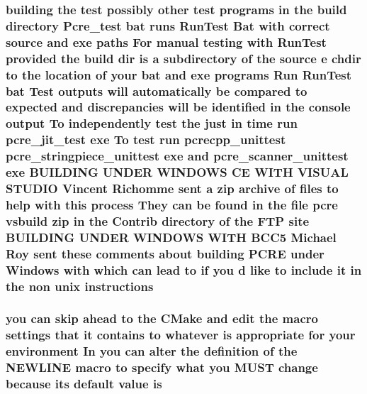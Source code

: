 \subsubsection[{\texorpdfstring{instructions}{instructions}}]{\setlength{\rightskip}{0pt plus 5cm}building the test possibly other test programs {\bf in} the build {\bf directory} Pcre\+\_\+test {\bf bat} runs Run\+Test Bat {\bf with} correct {\bf source} and {\bf exe} paths For manual testing {\bf with} Run\+Test provided the build {\bf dir} {\bf is} {\bf a} subdirectory {\bf of} the {\bf source} {\bf e} chdir {\bf to} the {\bf location} {\bf of} your {\bf bat} and {\bf exe} programs Run Run\+Test {\bf bat} Test outputs will automatically {\bf be} compared {\bf to} {\bf expected} and discrepancies will {\bf be} identified {\bf in} the console {\bf output} To independently test the just {\bf in} {\bf time} {\bf run} pcre\+\_\+jit\+\_\+test {\bf exe} To test {\bf run} pcrecpp\+\_\+unittest pcre\+\_\+stringpiece\+\_\+unittest {\bf exe} and pcre\+\_\+scanner\+\_\+unittest {\bf exe} B\+U\+I\+L\+D\+I\+NG U\+N\+D\+ER W\+I\+N\+D\+O\+WS CE W\+I\+TH V\+I\+S\+U\+AL S\+T\+U\+D\+IO Vincent Richomme {\bf sent} {\bf a} zip archive {\bf of} {\bf files} {\bf to} help {\bf with} {\bf this} {\bf process} They {\bf can} {\bf be} {\bf found} {\bf in} the {\bf file} {\bf pcre} vsbuild zip {\bf in} the Contrib {\bf directory} {\bf of} the F\+TP {\bf site} B\+U\+I\+L\+D\+I\+NG U\+N\+D\+ER W\+I\+N\+D\+O\+WS W\+I\+TH {\bf B\+C\+C5} Michael Roy {\bf sent} these comments about building {\bf P\+C\+RE} under {\bf Windows} {\bf with} {\bf which} {\bf can} lead {\bf to} {\bf if} you {\bf d} like {\bf to} {\bf include} {\bf it} {\bf in} the non unix instructions}\hypertarget{NON-AUTOTOOLS-BUILD_8txt_a8a5001d171323f53bb8190b20d31beea}{}\label{NON-AUTOTOOLS-BUILD_8txt_a8a5001d171323f53bb8190b20d31beea}
\subsubsection[{\texorpdfstring{is}{is}}]{\setlength{\rightskip}{0pt plus 5cm}you {\bf can} {\bf skip} ahead {\bf to} the C\+Make and edit the macro settings that {\bf it} {\bf contains} {\bf to} whatever is appropriate for your {\bf environment} In you {\bf can} alter the definition {\bf of} the {\bf N\+E\+W\+L\+I\+NE} macro {\bf to} specify {\bf what} you M\+U\+ST change because its {\bf default} {\bf value} is}\hypertarget{NON-AUTOTOOLS-BUILD_8txt_a010c062b977be79b82d0fd31a49c86ad}{}\label{NON-AUTOTOOLS-BUILD_8txt_a010c062b977be79b82d0fd31a49c86ad}
